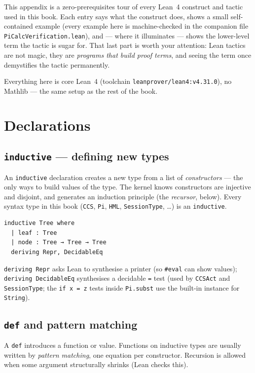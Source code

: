 \documentclass[11pt, a4paper, oneside]{book}
\newcommand{\lc}[1]{\texttt{#1}}
\begin{document}
This appendix is a zero-prerequisites tour of every Lean~4 construct and tactic
used in this book. Each entry says what the construct does, shows a small
self-contained example (every example here is machine-checked in the companion
file \lc{PiCalcVerification.lean}), and --- where it illuminates --- shows the
lower-level term the tactic is sugar for. That last part is worth your
attention: Lean tactics are not magic, they are \emph{programs that build proof
terms}, and seeing the term once demystifies the tactic permanently.

Everything here is core Lean~4 (toolchain \lc{leanprover/lean4:v4.31.0}), no
Mathlib --- the same setup as the rest of the book.

\section*{Declarations}

\subsection*{\lc{inductive} --- defining new types}

An \lc{inductive} declaration creates a new type from a list of
\emph{constructors} --- the only ways to build values of the type. The kernel
knows constructors are injective and disjoint, and generates an induction
principle (the \emph{recursor}, below). Every syntax type in this book
(\lc{CCS}, \lc{Pi}, \lc{HML}, \lc{SessionType}, \ldots) is an \lc{inductive}.

\begin{leanbox}
\begin{verbatim}
inductive Tree where
  | leaf : Tree
  | node : Tree → Tree → Tree
  deriving Repr, DecidableEq
\end{verbatim}
\end{leanbox}

\lc{deriving Repr} asks Lean to synthesise a printer (so \lc{\#eval} can show
values); \lc{deriving DecidableEq} synthesises a decidable \lc{=} test (used by
\lc{CCSAct} and \lc{SessionType}; the \lc{if x = z} tests inside
\lc{Pi.subst} use the built-in instance for \lc{String}).

\subsection*{\lc{def} and pattern matching}

A \lc{def} introduces a function or value. Functions on inductive types are
usually written by \emph{pattern matching}, one equation per constructor.
Recursion is allowed when some argument structurally shrinks (Lean checks
this).
\end{document}
